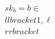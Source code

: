 \documentclass[preview]{standalone}
\begin{document}
\begin{align*}
sk_b = b \in \\llbracket 1, \ell \\rrbracket
\end{align*}
\end{document}
